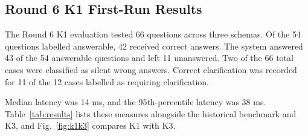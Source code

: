 \documentclass[conference]{IEEEtran}
\begin{document}
\subsection{Round 6 K1 First-Run Results}

The Round 6 K1 evaluation tested 66 questions across three schemas. Of the 54 questions labelled answerable, 42 received correct answers. The system answered 43 of the 54 answerable questions and left 11 unanswered. Two of the 66 total cases were classified as silent wrong answers. Correct clarification was recorded for 11 of the 12 cases labelled as requiring clarification.

Median latency was 14 ms, and the 95th-percentile latency was 38 ms. Table~\ref{tab:results} lists these measures alongside the historical benchmark and K3, and Fig.~\ref{fig:k1k3} compares K1 with K3.
\end{document}
